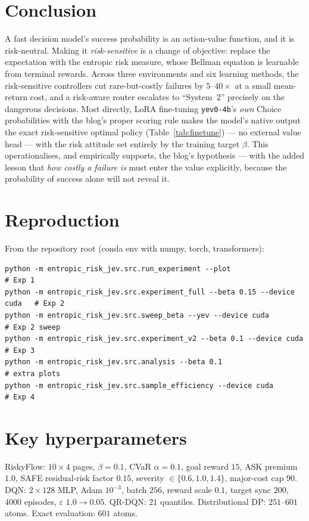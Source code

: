 \documentclass[11pt]{article}
\begin{document}
\section{Conclusion}
A fast decision model's success probability is an action-value function, and it is
risk-neutral. Making it \emph{risk-sensitive} is a change of objective: replace the
expectation with the entropic risk measure, whose Bellman equation is learnable
from terminal rewards. Across three environments and six learning methods, the
risk-sensitive controllers cut rare-but-costly failures by $5$--$40\times$ at a
small mean-return cost, and a risk-aware router escalates to ``System~2''
precisely on the dangerous decisions. Most directly, LoRA fine-tuning
\texttt{yev0-4b}'s \emph{own} Choice probabilities with the blog's proper scoring
rule makes the model's native output the exact risk-sensitive optimal policy
(Table~\ref{tab:finetune}) --- no external value head --- with the risk attitude
set entirely by the training target $\beta$. This operationalises, and empirically
supports, the blog's hypothesis --- with the added lesson that \emph{how costly a
failure is} must enter the value explicitly, because the probability of success
alone will not reveal it.

\appendix
\section{Reproduction}
From the repository root (conda env with numpy, torch, transformers):
\begin{verbatim}
python -m entropic_risk_jev.src.run_experiment --plot                 # Exp 1
python -m entropic_risk_jev.src.experiment_full --beta 0.15 --device cuda   # Exp 2
python -m entropic_risk_jev.src.sweep_beta --yev --device cuda         # Exp 2 sweep
python -m entropic_risk_jev.src.experiment_v2 --beta 0.1 --device cuda # Exp 3
python -m entropic_risk_jev.src.analysis --beta 0.1                    # extra plots
python -m entropic_risk_jev.src.sample_efficiency --device cuda        # Exp 4
\end{verbatim}

\section{Key hyperparameters}
RiskyFlow: $10\times4$ pages, $\beta{=}0.1$, CVaR $\alpha{=}0.1$, goal reward $15$,
ASK premium $1.0$, SAFE residual-risk factor $0.15$, severity $\in\{0.6,1.0,1.4\}$,
major-cost cap $90$. DQN: $2\times128$ MLP, Adam $10^{-3}$, batch $256$, reward
scale $0.1$, target sync $200$, $4000$ episodes, $\varepsilon$ $1.0\to0.05$.
QR-DQN: $21$ quantiles. Distributional DP: $251$--$601$ atoms. Exact evaluation:
$601$ atoms.
\end{document}
